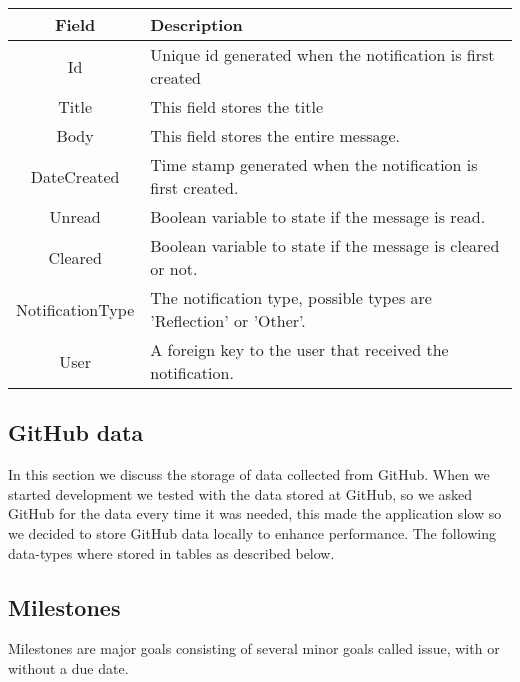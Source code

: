 \vspace{0.5cm}
\begin{tabularx}{\linewidth}{| c | X |}
    \hline
    \rowcolor[gray]{0.8}
    \textbf{Field} & \textbf{Description} \\
    \hline
    Id & Unique id generated when the notification is first created\\ \hline
    Title & This field stores the title\\ \hline
   	Body & This field stores the entire message.\\ \hline
    DateCreated & Time stamp generated when the notification is first created.\\ \hline
    Unread & Boolean variable to state if the message is read.\\ \hline
    Cleared & Boolean variable to state if the message is cleared or not.\\ \hline
    NotificationType & The notification type, possible types are 'Reflection' or 'Other'.\\ \hline
    User & A foreign key to the user that received the notification.\\ 
    \hline
\end{tabularx}
\vspace{0.5cm}

\subsection{GitHub data}
In this section we discuss the storage of data collected from GitHub. When we started development we tested with the data stored at GitHub, so we asked GitHub for the data every time it was needed, this made the application slow so we decided to store GitHub data locally to enhance performance. 
The following data-types where stored in tables as described below.

\subsection*{Milestones}
Milestones are major goals consisting of several minor goals called issue, with or without a due date. \\

